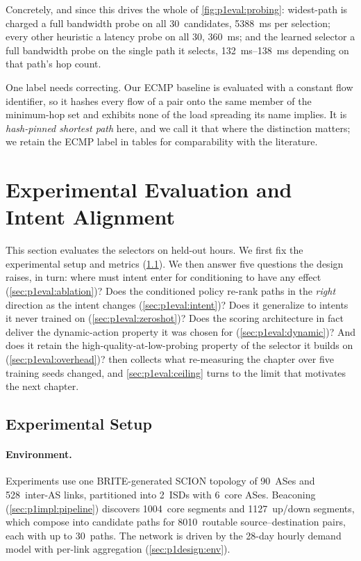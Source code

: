 Concretely, and since this drives the whole of \cref{fig:p1eval:probing}: widest-path is charged a full
bandwidth probe on all 30~candidates, \SI{5388}{\milli\second} per selection; every other heuristic a
latency probe on all 30, \SI{360}{\milli\second}; and the learned selector a full bandwidth probe on the
single path it selects, \SIrange{132}{138}{\milli\second} depending on that path's hop count.

One label needs correcting. Our ECMP baseline is evaluated with a constant flow identifier, so it hashes
every flow of a pair onto the same member of the minimum-hop set and exhibits none of the load spreading
its name implies. It is \emph{hash-pinned shortest path} here, and we call it that where the distinction
matters; we retain the ECMP label in tables for comparability with the literature.

\section{Experimental Evaluation and Intent Alignment}
\label{sec:sp:eval}

This section evaluates the selectors on held-out hours. We first fix the
experimental setup and metrics (\cref{sec:p1eval:setup}). We then answer five questions the design
raises, in turn: where must intent enter for conditioning to have any effect
(\cref{sec:p1eval:ablation})? Does the conditioned policy re-rank paths in the \emph{right} direction as
the intent changes (\cref{sec:p1eval:intent})? Does it generalize to intents it never trained on
(\cref{sec:p1eval:zeroshot})? Does the scoring architecture in fact deliver the dynamic-action property
it was chosen for (\cref{sec:p1eval:dynamic})? And does it retain the high-quality-at-low-probing
property of the selector it builds on (\cref{sec:p1eval:overhead})?  then
collects what re-measuring the chapter over five training seeds changed, and \cref{sec:p1eval:ceiling}
turns to the limit that motivates the next chapter.

\subsection{Experimental Setup}
\label{sec:p1eval:setup}

\paragraph{Environment.} Experiments use one BRITE-generated SCION topology of 90~ASes and 528~inter-AS
links, partitioned into 2~ISDs with 6~core ASes. Beaconing (\cref{sec:p1impl:pipeline}) discovers
1004~core segments and 1127~up/down segments, which compose into candidate paths for 8010~routable
source--destination pairs, each with up to 30~paths. The network is driven by the 28-day hourly demand
model with per-link aggregation (\cref{sec:p1design:env}).

